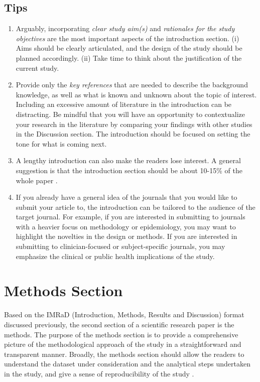 \documentclass[
]{book}
\providecommand{\tightlist}{%
  \setlength{\itemsep}{0pt}\setlength{\parskip}{0pt}}
\begin{document}
\hypertarget{tips}{%
\section{Tips}\label{tips}}

\begin{enumerate}
\def\labelenumi{\arabic{enumi}.}
\tightlist
\item
  Arguably, incorporating \emph{clear study aim(s)} and \emph{rationales for the study objectives} are the most important aspects of the introduction section. (i) Aims should be clearly articulated, and the design of the study should be planned accordingly. (ii) Take time to think about the justification of the current study.
\item
  Provide only the \emph{key references} that are needed to describe the background knowledge, as well as what is known and unknown about the topic of interest. Including an excessive amount of literature in the introduction can be distracting. Be mindful that you will have an opportunity to contextualize your research in the literature by comparing your findings with other studies in the Discussion section. The introduction should be focused on setting the tone for what is coming next.
\item
  A lengthy introduction can also make the readers lose interest. A general suggestion is that the introduction section should be about 10-15\% of the whole paper \citep{cals2013effective}.
\item
  If you already have a general idea of the journals that you would like to submit your article to, the introduction can be tailored to the audience of the target journal. For example, if you are interested in submitting to journals with a heavier focus on methodology or epidemiology, you may want to highlight the novelties in the design or methods. If you are interested in submitting to clinician-focused or subject-specific journals, you may emphasize the clinical or public health implications of the study.
\end{enumerate}

\hypertarget{methods-section}{%
\chapter{Methods Section}\label{methods-section}}

Based on the IMRaD (Introduction, Methods, Results and Discussion) format discussed previously, the second section of a scientific research paper is the methods. The purpose of the methods section is to provide a comprehensive picture of the methodological approach of the study in a straightforward and transparent manner. Broadly, the methods section should allow the readers to understand the dataset under consideration and the analytical steps undertaken in the study, and give a sense of reproducibility of the study \citep{annesley2010and, kotz2013effective3}.
\end{document}
